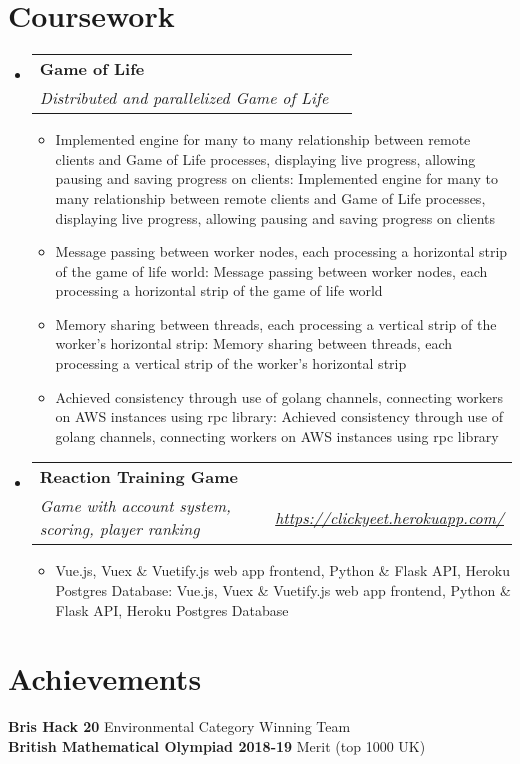 \documentclass[a4paper,11pt]{article}
\makeatletter
\def \ifempty#1{\def\temp{#1} \ifx\temp\empty }
\newcommand{\resumeItem}[2]{
  \item\small{
  	\ifempty{#1}#2\else\textbf{#1}{: #2 \vspace{-2pt}}\fi
  }
}
\newcommand{\resumeSubheading}[4]{
  \vspace{-1pt}\item
    \begin{tabular*}{0.97\textwidth}{l@{\extracolsep{\fill}}r}
      \textbf{#1} & #2 \\
      \textit{\small#3} & \textit{\small #4} \\
    \end{tabular*}\vspace{-5pt}
}
\newcommand{\resumeSubHeadingListStart}{\begin{itemize}[leftmargin=*]}
\newcommand{\resumeSubHeadingListEnd}{\end{itemize}}
\newcommand{\resumeItemListStart}{\begin{itemize}}
\newcommand{\resumeItemListEnd}{\end{itemize}\vspace{-5pt}}
\makeatother
\begin{document}
\section{Coursework}
  \resumeSubHeadingListStart
    \resumeSubheading
      {Game of Life}{}
      {Distributed and parallelized Game of Life}{}
      \resumeItemListStart
        \resumeItem{}
          {Implemented engine for many to many relationship between remote clients and Game of Life processes, displaying live progress, allowing pausing and saving progress on clients}
        \resumeItem{}
          {Message passing between worker nodes, each processing a horizontal strip of the game of life world}
        \resumeItem{}
          {Memory sharing between threads, each processing a vertical strip of the worker's horizontal strip}
        \resumeItem{}
          {Achieved consistency through use of golang channels, connecting workers on AWS instances using rpc library}
      \resumeItemListEnd
    \resumeSubheading
      {Reaction Training Game}{}
      {Game with account system, scoring, player ranking}{\href{https://clickyeet.herokuapp.com/}
      {https://clickyeet.herokuapp.com/}}
      \resumeItemListStart
        \resumeItem{}
          {Vue.js, Vuex \& Vuetify.js web app frontend, Python \& Flask API, Heroku Postgres Database}
      \resumeItemListEnd
  \resumeSubHeadingListEnd


\section{Achievements}
  \textbf{Bris Hack 20}{ Environmental Category Winning Team} \\
  \textbf{British Mathematical Olympiad 2018-19}{ Merit (top 1000 UK)} \\
  
  
\end{document}
